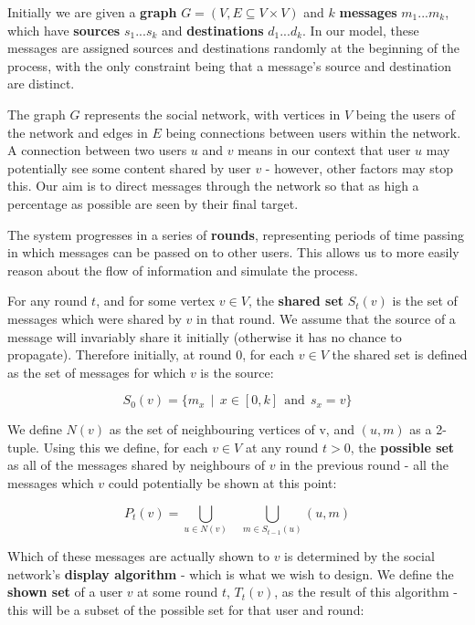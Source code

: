 \documentclass[bsc,frontabs,twoside,singlespacing,parskip,deptreport]{infthesis}     %
\begin{document}
Initially we are given a \textbf{graph} $G = (V, E \subseteq V \times V)$ and $k$ \textbf{messages} $ m_{1} ... m_{k}$, which have \textbf{sources} $s_{1} ... s_{k}$ and \textbf{destinations} $d_{1} ... d_{k}$. In our model, these messages are assigned sources and destinations randomly at the beginning of the process, with the only constraint being that a message's source and destination are distinct.

The graph $G$ represents the social network, with vertices in $V$ being the users of the network and edges in $E$ being connections between users within the network. A connection between two users $u$ and $v$ means in our context that user $u$ may potentially see some content shared by user $v$ - however, other factors may stop this. Our aim is to direct messages through the network so that as high a percentage as possible are seen by their final target.

The system progresses in a series of \textbf{rounds}, representing periods of time passing in which messages can be passed on to other users. This allows us to more easily reason about the flow of information and simulate the process.

For any round $t$, and for some vertex $v \in V$, the \textbf{shared set} $S_{t}(v)$ is the set of messages which were shared by $v$ in that round. We assume that the source of a message will invariably share it initially (otherwise it has no chance to propagate). Therefore initially, at round 0, for each $v \in V$ the shared set is defined as the set of messages for which $v$ is the source:

\begin{equation}
S_{0}(v) = \{m_{x} \:\: | \:\: x \in [0, k] \:\: \text{and} \:\: s_{x} = v\}
\end{equation}


We define $N(v)$ as the set of neighbouring vertices of v, and $(u, m)$ as a 2-tuple. Using this we define, for each $v \in V$ at any round $t > 0$, the \textbf{possible set} as all of the messages shared by neighbours of $v$ in the previous round - all the messages which $v$ could potentially be shown at this point:

\begin{equation}
P_{t}(v) = \bigcup_{u \in N(v)} \:\:\:\: \bigcup_{m \in S_{t-1}(u)} (u, m)
\end{equation}

Which of these messages are actually shown to $v$ is determined by the social network's \textbf{display algorithm} - which is what we wish to design. We define the \textbf{shown set} of a user $v$ at some round $t$, $T_{t}(v)$, as the result of this algorithm - this will be a subset of the possible set for that user and round:
\end{document}
